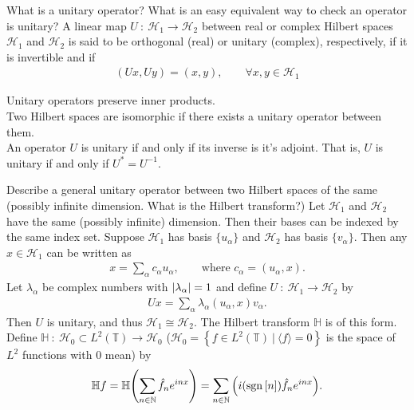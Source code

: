 \documentclass[avery5388,grid,frame]{flashcards}
\newcommand{\sgn}[1]{\mathrm{sgn}\left[#1\right]}
\newcommand{\f}[3]{#1\ :\ #2 \rightarrow #3}
\def\hilb{\mathcal{H}}
\def\torus{\mathbb{T}}
\begin{document}
\begin{flashcard}
    {What is a unitary operator?  What is an easy equivalent way to check an operator is unitary?}
    A linear map $\f{U}{\hilb_1}{\hilb_2}$ between real or complex Hilbert spaces $\hilb_1$ and $\hilb_2$ is said to be orthogonal (real) or unitary (complex), respectively, if it is invertible and if
    \begin{align*}
        (Ux,Uy) = (x,y), \qquad \forall x,y \in \hilb_1
    \end{align*}

    Unitary operators preserve inner products. \\

    Two Hilbert spaces are isomorphic if there exists a unitary operator between them. \\

    An operator $U$ is unitary if and only if its inverse is it's adjoint.  That is, $U$ is unitary if and only if $U^* = U^{-1}$.
\end{flashcard}

\begin{flashcard}
    {Describe a general unitary operator between two Hilbert spaces of the same (possibly infinite dimension.  What is the Hilbert transform?)}
    Let $\hilb_1$ and $\hilb_2$ have the same (possibly infinite) dimension.  Then their bases can be indexed by the same index set.  Suppose $\hilb_1$ has basis $\{u_\alpha\}$ and $\hilb_2$ has basis $\{v_\alpha\}$.  Then any $x \in \hilb_1$ can be written as
    \vspace{-7pt}
    \begin{align*}
        x = \sum_\alpha c_\alpha u_\alpha, \qquad \text{where } c_\alpha = (u_\alpha, x).
    \end{align*}
    Let $\lambda_\alpha$ be complex numbers with $\abs{\lambda_\alpha} = 1$ and define $\f{U}{\hilb_1}{\hilb_2}$ by
    \vspace{-7pt}
    \begin{align*}
        Ux = \sum_\alpha \lambda_\alpha (u_\alpha,x)v_\alpha.
    \end{align*}
    Then $U$ is unitary, and thus $\hilb_1 \cong \hilb_2$.  The Hilbert transform $\mathbb{H}$ is of this form.  Define $\f{\mathbb{H}}{\hilb_0 \subset L^2(\torus)}{\hilb_0}$ ($\hilb_0 = \left\{f \in L^2(\torus)\ |\ \langle f \rangle = 0\right\}$ is the space of $L^2$ functions with $0$ mean) by
    \vspace{-7pt}
    \begin{align*}
        \mathbb{H}f = \mathbb{H}\qty(\sum_{n\in\mathbb{N}}\hat{f}_ne^{inx}) = \sum_{n\in\mathbb{N}}\qty(i(\sgn{n})\hat{f}_n e^{inx}).
    \end{align*}
\end{flashcard}
\end{document}
